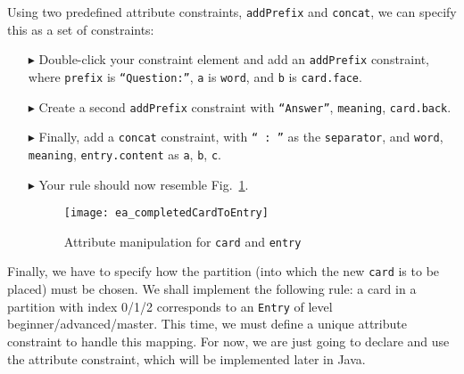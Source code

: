 Using two predefined attribute constraints, \texttt{addPrefix} and \texttt{concat}, we can specify this as a set of constraints:

\begin{enumerate}
\item[$\blacktriangleright$] Double-click your constraint element and add an \texttt{addPrefix} constraint, where \texttt{prefix} is \texttt{``Question:''},
\texttt{a} is \texttt{word}, and \texttt{b} is \texttt{card.face}.
  
\item[$\blacktriangleright$] Create a second \texttt{addPrefix} constraint with \texttt{``Answer''}, \texttt{meaning}, \texttt{card.back}.

\item[$\blacktriangleright$] Finally, add a \texttt{concat} constraint, with \texttt{``~:~''} as the \texttt{separator}, and \texttt{word}, \texttt{meaning},
\texttt{entry.content} as \texttt{a}, \texttt{b}, \texttt{c}.

\item[$\blacktriangleright$] Your rule should now resemble Fig.~\ref{fig:cardtoentry_2}.

\begin{figure}[htbp]
\begin{center}
  \texttt{[image: ea\_completedCardToEntry]}
  \caption{Attribute manipulation for \texttt{card} and \texttt{entry}}
  \label{fig:cardtoentry_2}
\end{center}
\end{figure}
\FloatBarrier
\end{enumerate}

Finally, we have to specify how the partition (into which the new \texttt{card} is to be placed) must be chosen.
We shall implement the following rule: a card in a partition with index 0/1/2 corresponds to an \texttt{Entry} of level beginner/advanced/master.
This time, we must define a unique attribute constraint to handle this mapping. For now, we are just going to declare and use the attribute constraint, which
will be implemented later in Java.

